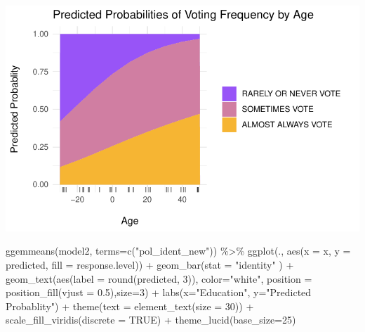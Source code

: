 \documentclass[
  letterpaper,
  DIV=11,
  numbers=noendperiod]{scrartcl}
\newenvironment{Shaded}{\begin{snugshade}}{\end{snugshade}}
\newcommand{\AttributeTok}[1]{\textcolor[rgb]{0.40,0.45,0.13}{#1}}
\newcommand{\ConstantTok}[1]{\textcolor[rgb]{0.56,0.35,0.01}{#1}}
\newcommand{\DecValTok}[1]{\textcolor[rgb]{0.68,0.00,0.00}{#1}}
\newcommand{\FloatTok}[1]{\textcolor[rgb]{0.68,0.00,0.00}{#1}}
\newcommand{\FunctionTok}[1]{\textcolor[rgb]{0.28,0.35,0.67}{#1}}
\newcommand{\NormalTok}[1]{\textcolor[rgb]{0.00,0.23,0.31}{#1}}
\newcommand{\SpecialCharTok}[1]{\textcolor[rgb]{0.37,0.37,0.37}{#1}}
\newcommand{\StringTok}[1]{\textcolor[rgb]{0.13,0.47,0.30}{#1}}
\begin{document}
\includegraphics{Lab4_multinom_Questions-1_files/figure-pdf/unnamed-chunk-14-1.pdf}

\begin{Shaded}
\begin{Highlighting}[]
 \FunctionTok{ggemmeans}\NormalTok{(model2, }\AttributeTok{terms=}\FunctionTok{c}\NormalTok{(}\StringTok{"pol\_ident\_new"}\NormalTok{)) }\SpecialCharTok{\%\textgreater{}\%}   \FunctionTok{ggplot}\NormalTok{(., }\FunctionTok{aes}\NormalTok{(}\AttributeTok{x =}\NormalTok{ x, }\AttributeTok{y =}\NormalTok{ predicted, }\AttributeTok{fill =}\NormalTok{ response.level)) }\SpecialCharTok{+} 
  \FunctionTok{geom\_bar}\NormalTok{(}\AttributeTok{stat =} \StringTok{"identity"}\NormalTok{ ) }\SpecialCharTok{+}
    \FunctionTok{geom\_text}\NormalTok{(}\FunctionTok{aes}\NormalTok{(}\AttributeTok{label =} \FunctionTok{round}\NormalTok{(predicted, }\DecValTok{3}\NormalTok{)), }\AttributeTok{color=}\StringTok{"white"}\NormalTok{, }\AttributeTok{position =} \FunctionTok{position\_fill}\NormalTok{(}\AttributeTok{vjust =} \FloatTok{0.5}\NormalTok{),}\AttributeTok{size=}\DecValTok{3}\NormalTok{)  }\SpecialCharTok{+} 
  \FunctionTok{labs}\NormalTok{(}\AttributeTok{x=}\StringTok{"Education"}\NormalTok{, }\AttributeTok{y=}\StringTok{"Predicted Probablity"}\NormalTok{) }\SpecialCharTok{+} 
  \FunctionTok{theme}\NormalTok{(}\AttributeTok{text =} \FunctionTok{element\_text}\NormalTok{(}\AttributeTok{size =} \DecValTok{30}\NormalTok{)) }\SpecialCharTok{+}  
  \FunctionTok{scale\_fill\_viridis}\NormalTok{(}\AttributeTok{discrete =} \ConstantTok{TRUE}\NormalTok{) }\SpecialCharTok{+} 
  \FunctionTok{theme\_lucid}\NormalTok{(}\AttributeTok{base\_size=}\DecValTok{25}\NormalTok{)}
\end{Highlighting}
\end{Shaded}
\end{document}
